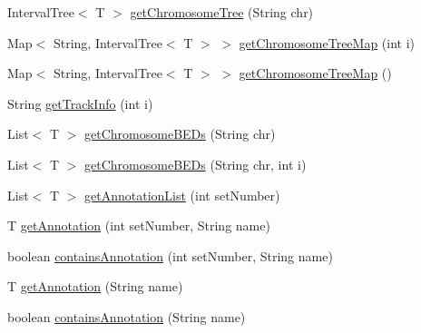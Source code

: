 \begin{DoxyCompactItemize}
\item 
Interval\+Tree$<$ T $>$ \hyperlink{classbroad_1_1core_1_1annotation_1_1_annotation_reader_3_01_t_01extends_01_genomic_annotation_01_4_ad23e0f8f065f211adc7fd67201b2a853}{get\+Chromosome\+Tree} (String chr)
\item 
Map$<$ String, Interval\+Tree$<$ T $>$ $>$ \hyperlink{classbroad_1_1core_1_1annotation_1_1_annotation_reader_3_01_t_01extends_01_genomic_annotation_01_4_a6af994265d45e558896a30af64bf37f3}{get\+Chromosome\+Tree\+Map} (int i)
\item 
Map$<$ String, Interval\+Tree$<$ T $>$ $>$ \hyperlink{classbroad_1_1core_1_1annotation_1_1_annotation_reader_3_01_t_01extends_01_genomic_annotation_01_4_a37e29b1dc4659b1e1aac4493effcd5be}{get\+Chromosome\+Tree\+Map} ()
\item 
String \hyperlink{classbroad_1_1core_1_1annotation_1_1_annotation_reader_3_01_t_01extends_01_genomic_annotation_01_4_ad3fef635ef16bb2001844d16ae4155f8}{get\+Track\+Info} (int i)
\item 
List$<$ T $>$ \hyperlink{classbroad_1_1core_1_1annotation_1_1_annotation_reader_3_01_t_01extends_01_genomic_annotation_01_4_a0c4976c92588ad35e262e90ebca4382f}{get\+Chromosome\+B\+E\+Ds} (String chr)
\item 
List$<$ T $>$ \hyperlink{classbroad_1_1core_1_1annotation_1_1_annotation_reader_3_01_t_01extends_01_genomic_annotation_01_4_a51088ddeb9131738bac7da8968ffbfab}{get\+Chromosome\+B\+E\+Ds} (String chr, int i)
\item 
List$<$ T $>$ \hyperlink{classbroad_1_1core_1_1annotation_1_1_annotation_reader_3_01_t_01extends_01_genomic_annotation_01_4_ade7e4808675687f787ac8af08c2adb53}{get\+Annotation\+List} (int set\+Number)
\item 
T \hyperlink{classbroad_1_1core_1_1annotation_1_1_annotation_reader_3_01_t_01extends_01_genomic_annotation_01_4_a68641405ddb243b4315928dd9defc511}{get\+Annotation} (int set\+Number, String name)
\item 
boolean \hyperlink{classbroad_1_1core_1_1annotation_1_1_annotation_reader_3_01_t_01extends_01_genomic_annotation_01_4_afc5bc223c3e7bac8c5d2e8267f8c4725}{contains\+Annotation} (int set\+Number, String name)
\item 
T \hyperlink{classbroad_1_1core_1_1annotation_1_1_annotation_reader_3_01_t_01extends_01_genomic_annotation_01_4_aa3f385bf901303a94b1b51e6debad1eb}{get\+Annotation} (String name)
\item 
boolean \hyperlink{classbroad_1_1core_1_1annotation_1_1_annotation_reader_3_01_t_01extends_01_genomic_annotation_01_4_a53db7b580a4783e5d6b3302ac59e7fb1}{contains\+Annotation} (String name)

\end{DoxyCompactItemize}
